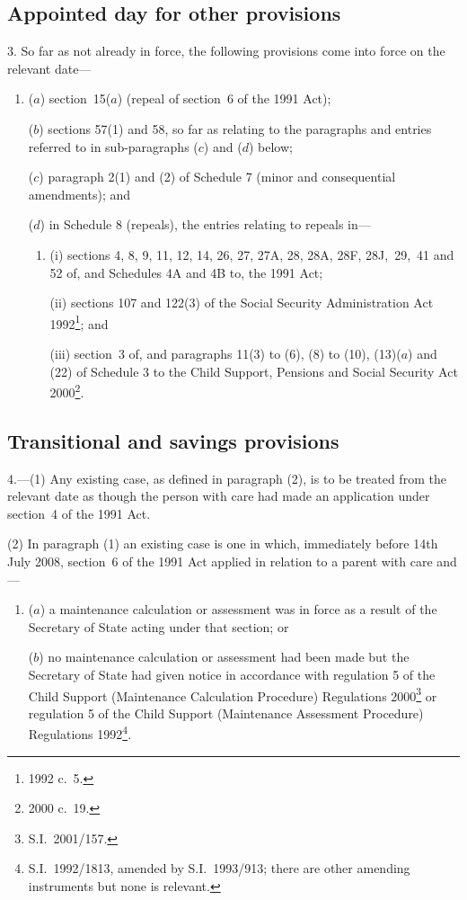 \documentclass[12pt,a4paper]{article}
\begin{document}
\subsection[3. Appointed day for other provisions]{Appointed day for other provisions}

3.  So far as not already in force, the following provisions come into force on the relevant date—
\begin{enumerate}\item[]
($a$) section~15($a$)  (repeal of section~6 of the 1991 Act);

($b$) sections 57(1) and 58, so far as relating to the paragraphs and entries referred to in sub-paragraphs ($c$)  and ($d$)  below;

($c$) paragraph 2(1) and (2) of Schedule 7 (minor and consequential amendments); and

($d$) in Schedule 8 (repeals), the entries relating to repeals in—
\begin{enumerate}\item[]
(i) sections 4, 8, 9, 11, 12, 14, 26, 27, 27A, 28, 28A, 28F, 28J,~29,~41 and 52 of, and Schedules 4A and 4B to, the 1991 Act;

(ii) sections 107 and 122(3) of the Social Security Administration Act 1992\footnote{1992 c.~5.}; and

(iii) section~3 of, and paragraphs 11(3) to (6), (8) to (10), (13)($a$)  and (22) of Schedule 3 to the Child Support, Pensions and Social Security Act 2000\footnote{2000 c.~19.}.
\end{enumerate}
\end{enumerate}

\subsection[4. Transitional and savings provisions]{Transitional and savings provisions}

4.---(1)  Any existing case, as defined in paragraph (2), is to be treated from the relevant date as though the person with care had made an application under section~4 of the 1991 Act.

(2) In paragraph (1) an existing case is one in which, immediately before 14th July 2008, section~6 of the 1991 Act applied in relation to a parent with care and—
\begin{enumerate}\item[]
($a$) a maintenance calculation or assessment was in force as a result of the Secretary of State acting under that section; or

($b$) no maintenance calculation or assessment had been made but the Secretary of State had given notice in accordance with regulation 5 of the Child Support (Maintenance Calculation Procedure) Regulations 2000\footnote{S.I.~2001/157.} or regulation 5 of the Child Support (Maintenance Assessment Procedure) Regulations 1992\footnote{S.I.~1992/1813, amended by S.I.~1993/913; there are other amending instruments but none is relevant.}.
\end{enumerate}
\end{document}
